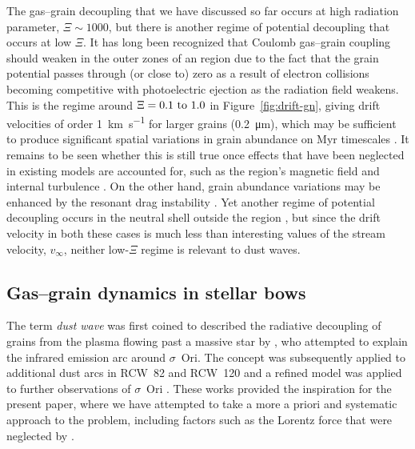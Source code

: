 The gas--grain decoupling that we have discussed so far occurs at high
radiation parameter, \(\Xi \sim 1000\), but there is another regime of
potential decoupling that occurs at low \(\Xi\).  It has long been
recognized \citep{Gail:1979a} that Coulomb gas--grain coupling should
weaken in the outer zones of an \hii{} region due to the fact that the
grain potential passes through (or close to) zero as a result of
electron collisions becoming competitive with photoelectric ejection
as the radiation field weakens.  This is the regime around
\(\Xi = \text{\numrange{0.1}{1.0}}\) in Figure~\ref{fig:drift-gn},
giving drift velocities of order \SI{1}{km.s^{-1}} for larger grains
(\SI{0.2}{\um}), which may be sufficient to produce significant
spatial variations in grain abundance on Myr timescales
\citep{Ishiki:2018a}. It remains to be seen whether this is still true
once effects that have been neglected in existing models are accounted
for, such as the \hii{} region's magnetic field \citep{Krumholz:2007a,
  Arthur:2011a, Gendelev:2012a} and internal turbulence
\citep{Arthur:2016a}.  On the other hand, grain abundance variations
may be enhanced by the resonant drag instability \citep{Squire:2018a,
  Hopkins:2018a}.  Yet another regime of potential decoupling occurs
in the neutral shell outside the \hii{} region
\citep{Gustafsson:2018a}, but since the drift velocity in both these
cases is much less than interesting values of the stream velocity,
\(v_\infty\), neither low-\(\Xi\) regime is relevant to dust waves.

\subsection{Gas--grain dynamics in stellar bows}
\label{sec:gas-grain-dynamics-bs}

The term \textit{dust wave} was first coined to described the
radiative decoupling of grains from the plasma flowing past a massive
star by \citet{Ochsendorf:2014b}, who attempted to explain the
infrared emission arc around \(\sigma\)~Ori.  The concept was subsequently
applied to additional dust arcs in RCW~82 and RCW~120
\citep{Ochsendorf:2014a} and a refined model was applied to further
observations of \(\sigma\)~Ori \citep{Ochsendorf:2015a}.  These works
provided the inspiration for the present paper, where we have
attempted to take a more a priori and systematic approach to the
problem, including factors such as the Lorentz force that were
neglected by \citeauthor{Ochsendorf:2014b}.

